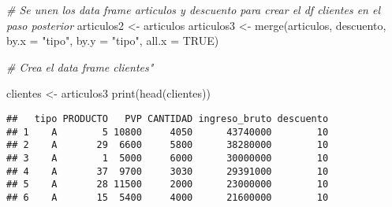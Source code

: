 \documentclass[
  12pt,
]{article}
\newenvironment{Shaded}{\begin{snugshade}}{\end{snugshade}}
\newcommand{\AttributeTok}[1]{\textcolor[rgb]{0.77,0.63,0.00}{#1}}
\newcommand{\CommentTok}[1]{\textcolor[rgb]{0.56,0.35,0.01}{\textit{#1}}}
\newcommand{\ConstantTok}[1]{\textcolor[rgb]{0.00,0.00,0.00}{#1}}
\newcommand{\FunctionTok}[1]{\textcolor[rgb]{0.00,0.00,0.00}{#1}}
\newcommand{\NormalTok}[1]{#1}
\newcommand{\OtherTok}[1]{\textcolor[rgb]{0.56,0.35,0.01}{#1}}
\newcommand{\StringTok}[1]{\textcolor[rgb]{0.31,0.60,0.02}{#1}}
\begin{document}
\begin{Shaded}
\begin{Highlighting}[]
\CommentTok{\# Se unen los data frame articulos y descuento para crear el df clientes en el paso posterior}
\NormalTok{articulos2 }\OtherTok{\textless{}{-}}\NormalTok{ articulos}
\NormalTok{articulos3 }\OtherTok{\textless{}{-}} \FunctionTok{merge}\NormalTok{(articulos, descuento, }\AttributeTok{by.x =} \StringTok{"tipo"}\NormalTok{, }\AttributeTok{by.y =} \StringTok{"tipo"}\NormalTok{, }\AttributeTok{all.x =} \ConstantTok{TRUE}\NormalTok{)}


\CommentTok{\# Crea el data frame clientes"}

\NormalTok{clientes }\OtherTok{\textless{}{-}}\NormalTok{ articulos3}
\FunctionTok{print}\NormalTok{(}\FunctionTok{head}\NormalTok{(clientes))}
\end{Highlighting}
\end{Shaded}

\begin{verbatim}
##   tipo PRODUCTO   PVP CANTIDAD ingreso_bruto descuento
## 1    A        5 10800     4050      43740000        10
## 2    A       29  6600     5800      38280000        10
## 3    A        1  5000     6000      30000000        10
## 4    A       37  9700     3030      29391000        10
## 5    A       28 11500     2000      23000000        10
## 6    A       15  5400     4000      21600000        10
\end{verbatim}
\end{document}
